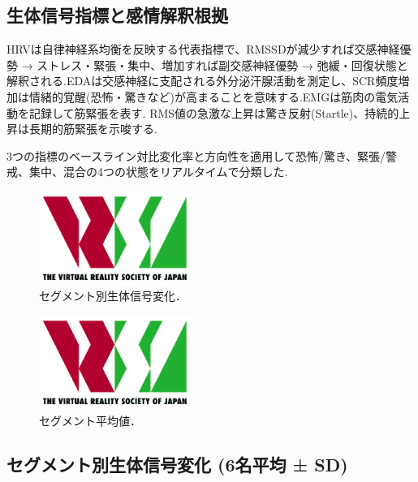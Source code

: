 \documentclass[a4paper]{jarticle}
\begin{document}
\subsection{生体信号指標と感情解釈根拠}

HRVは自律神経系均衡を反映する代表指標で、RMSSDが減少すれば交感神経優勢 → ストレス・緊張・集中、増加すれば副交感神経優勢 → 弛緩・回復状態と解釈される\cite{bib07,bib08}.EDAは交感神経に支配される外分泌汗腺活動を測定し、SCR頻度増加は情緒的覚醒(恐怖・驚きなど)が高まることを意味する\cite{bib09,bib10}.EMGは筋肉の電気活動を記録して筋緊張を表す. RMS値の急激な上昇は驚き反射(Startle)、持続的上昇は長期的筋緊張を示唆する.\cite{bib11,bib12}

3つの指標のベースライン対比変化率と方向性を適用して恐怖/驚き、緊張/警戒、集中、混合の4つの状態をリアルタイムで分類した.

\begin{figure}[tb]
  \begin{center}
    \includegraphics*[width=50mm]{logo.png}
  \end{center}
  \vspace*{-6mm}
  \caption{セグメント別生体信号変化．}
  \label{figure}
\end{figure}

\begin{figure}[tb]
  \begin{center}
    \includegraphics*[width=50mm]{logo.png}
  \end{center}
  \vspace*{-6mm}
  \caption{セグメント平均値．}
  \label{figure}
\end{figure}

\subsection{セグメント別生体信号変化 (6名平均 ± SD)}
\end{document}
